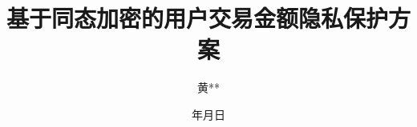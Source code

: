 \documentclass[]{XDUthesis-personal/XDUthesis}
\title{基于同态加密的用户交易金额隐私保护方案}
\author{黄**}
\date{\qquad 年\qquad 月\qquad 日}
\begin{document}


\makeatletter
\XDU@setpdf@keywords
\makeatother
\maketitle






% 





\end{document}
